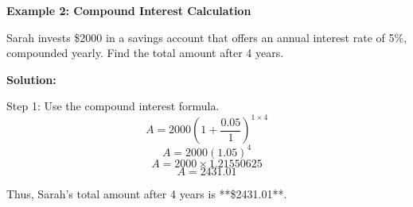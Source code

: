 \begin{flushleft}
	\textbf{Example 2: Compound Interest Calculation}
	
	Sarah invests \$2000 in a savings account that offers an annual interest rate of 5\%, compounded yearly. Find the total amount after 4 years.
	
	\textbf{Solution:}
	
	Step 1: Use the compound interest formula.
	\[
	A = 2000 \left(1 + \frac{0.05}{1} \right)^{1 \times 4}
	\]
	\[
	A = 2000 \left(1.05 \right)^4
	\]
	\[
	A = 2000 \times 1.21550625
	\]
	\[
	A = 2431.01
	\]
	
	Thus, Sarah's total amount after 4 years is **\$2431.01**.
\end{flushleft}